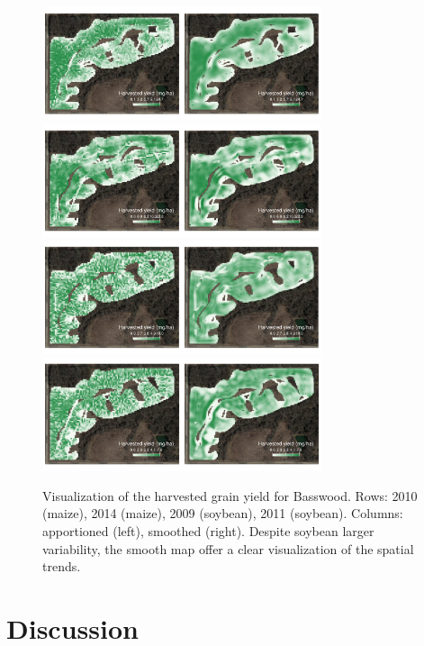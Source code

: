 \documentclass[12pt]{article}
\begin{document}
\begin{figure}[ht]  \centering
  \includegraphics[width=0.73\textwidth]{basswood_2010_res5_1_agg_smoothed}
  \includegraphics[width=0.73\textwidth]{basswood_2014_res5_1_agg_smoothed}
  \includegraphics[width=0.73\textwidth]{basswood_2009_res5_1_agg_smoothed}
  \includegraphics[width=0.73\textwidth]{basswood_2011_res5_1_agg_smoothed}
  \caption[Visualization of the algorithm output for one field across
  four different years]{Visualization of the harvested grain yield for
    Basswood. Rows: 2010 (maize), 2014 (maize), 2009 (soybean), 2011
    (soybean). Columns: apportioned (left), smoothed (right). Despite
    soybean larger variability, the smooth map offer a clear
    visualization of the spatial trends. }%
  \label{fig:basswood-history}
\end{figure}

\section{Discussion}
\end{document}
